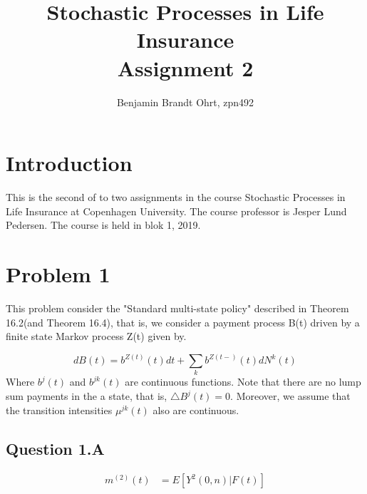 \documentclass[12pt]{article}
\begin{document}
\title{Stochastic Processes in Life Insurance \\
\large Assignment 2}
\author{Benjamin Brandt Ohrt, zpn492}
\maketitle

\section{Introduction}
This is the second of to two assignments in the course Stochastic Processes in Life Insurance at Copenhagen University. The course professor is Jesper Lund Pedersen. The course is held in blok 1, 2019.

\section{Problem 1}

This problem consider the "Standard multi-state policy" described in Theorem 16.2(and Theorem 16.4), that is, we consider a payment process B(t) driven by a finite state Markov process Z(t) given by.

\begin{equation}
dB(t) = b^{Z(t)}(t)dt + \sum_k b^{Z(t-)}(t)dN^k(t)
\end{equation}
Where $b^j(t)$ and $b^{jk}(t)$ are continuous functions. Note that there are no lump sum payments in the a state, that is, $\triangle B^j(t) = 0$. Moreover, we assume that the transition intensities $\mu^{jk}(t)$ also are continuous.

\subsection{Question 1.A}

\begin{equation}
\begin{split}
m^{(2)}(t) 	& = E[Y^2(0,n)|F(t)] 
\end{split}
\end{equation}
\end{document}
